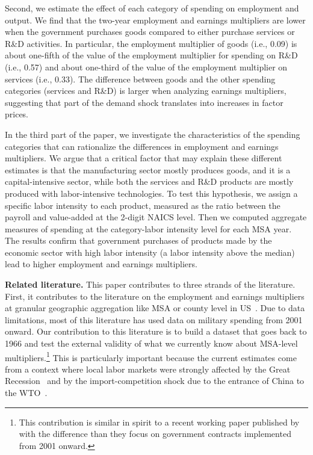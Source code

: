 \documentclass[dv_diss_main.tex]{subfiles}
\begin{document}
Second, we estimate the effect of each category of spending on employment and output. We find that the two-year employment and earnings multipliers are lower when the government purchases goods compared to either purchase services or R\&D activities. In particular, the employment multiplier of goods (i.e., 0.09) is about one-fifth of the value of the employment multiplier for spending on R\&D (i.e., 0.57) and about one-third of the value of the employment multiplier on services (i.e., 0.33). The difference between goods and the other spending categories (services and R&D) is larger when analyzing earnings multipliers, suggesting that part of the demand shock translates into increases in factor prices.   

In the third part of the paper, we investigate the characteristics of the spending categories that can rationalize the differences in employment and earnings multipliers. We argue that a critical factor that may explain these different estimates is that the manufacturing sector mostly produces goods, and it is a capital-intensive sector, while both the services and R\&D products are mostly produced with labor-intensive technologies. 
To test this hypothesis, we assign a specific labor intensity to each product, measured as the ratio between the payroll and value-added at the 2-digit NAICS level. Then we computed aggregate measures of spending at the category-labor intensity level for each MSA year. The results confirm that government purchases of products made by the economic sector with high labor intensity (a labor intensity above the median) lead to higher employment and earnings multipliers.

\textbf{Related literature.} This paper contributes to three strands of the literature. First, it contributes to the literature on the employment and earnings multipliers at granular geographic aggregation like MSA or county level in US~\citep{suarez2016estimating, Demyanyk2019, Auerbach2019, Auerbach2020, Juarros2021}. Due to data limitations, most of this literature has used data on military spending from 2001 onward. Our contribution to this literature is to build a dataset that goes back to 1966 and test the external validity of what we currently know about MSA-level multipliers.\footnote{This contribution is similar in spirit to a recent working paper published by \citep{Cox2021} with the difference than they focus on government contracts implemented from 2001 onward.} This is particularly important because the current estimates come from a context where local labor markets were strongly affected by the Great Recession~\citep{yagan2019employment} and by the import-competition shock due to the entrance of China to the WTO~\citep{autor2016importing}.
\end{document}
